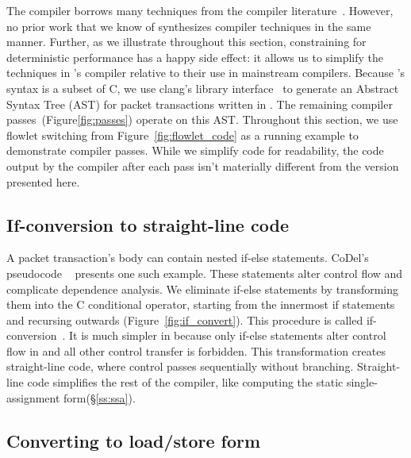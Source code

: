 The \pktlanguage compiler borrows many techniques from the compiler
literature~\cite{muchnik}. However, no prior work that we know of synthesizes
compiler techniques in the same manner. Further, as we illustrate throughout
this section, constraining \pktlanguage for deterministic performance has a
happy side effect: it allows us to simplify the techniques in \pktlanguage's
compiler relative to their use in mainstream compilers. Because \pktlanguage's
syntax is a subset of C, we use clang's library interface~\cite{libclang} to
generate an Abstract Syntax Tree (AST) for packet transactions written in
\pktlanguage. The remaining compiler passes~(Figure\ref{fig:passes}) operate on
this AST. Throughout this section, we use flowlet switching from
Figure~\ref{fig:flowlet_code} as a running example to demonstrate compiler passes.
While we simplify code for readability, the code output by the \pktlanguage
compiler after each pass isn't materially different from the version presented
here.

\subsection{If-conversion to straight-line code}
A packet transaction's body can contain nested if-else statements. CoDel's
pseudocode ~\cite{codel_code} presents one such example. These statements alter
control flow and complicate dependence analysis. We eliminate if-else
statements by transforming them into the C conditional operator, starting from
the innermost if statements and recursing outwards
(Figure~\ref{fig:if_convert}). This procedure is called
if-conversion~\cite{if_conversion}. It is much simpler in \pktlanguage because
only if-else statements alter control flow in \pktlanguage and all other
control transfer is forbidden.  This transformation creates straight-line code,
where control passes sequentially without branching.  Straight-line code
simplifies the rest of the compiler, like computing the static
single-assignment form(\S\ref{ss:ssa}).

\subsection{Converting to load/store form}
\label{ss:load/store}

